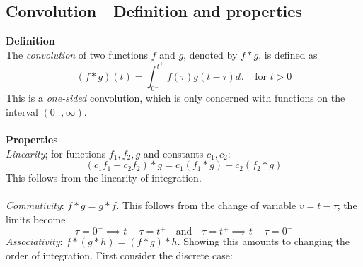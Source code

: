 \documentclass{report}
\begin{document}
\subsection{Convolution---Definition and properties}
\textbf{Definition}\\
The \textit{convolution} of two functions $f$ and $g$,
denoted by $f*g$, is defined as
\begin{equation*}
(f*g)(t)=\int^{t^+}_{0^-}f(\tau)g(t-\tau)d\tau\quad\text{for }t>0
\end{equation*}
This is a \textit{one-sided} convolution, which is only concerned with functions on the interval $(0^-,\infty)$.\\
\vspace{1mm}\\
\textbf{Properties}\\
\textit{Linearity}; for functions $f_1,f_2,g$ and constants $c_1,c_2$:
\begin{equation*}
(c_1f_1+c_2f_2)*g=c_1(f_1*g)+c_2(f_2*g)
\end{equation*}
This follows from the linearity of integration.\\
\vspace{1mm}\\
\textit{Commutivity}: $f*g=g*f$. This follows from the change of variable $v=t-\tau$; the limits become
\begin{equation*}
\tau=0^-\implies t-\tau=t^+\quad\text{and}\quad\tau=t^+\implies t-\tau=0^-
\end{equation*}
\textit{Associativity}: $f*(g*h)=(f*g)*h$. Showing this amounts to changing the order of integration. 
First consider the discrete case:
\end{document}
